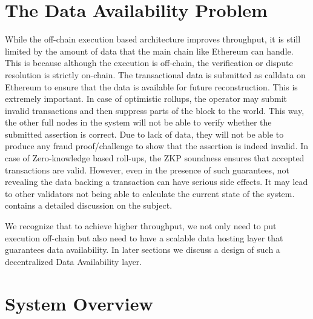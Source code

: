 \documentclass[sigconf, screen=true, nonacm]{acmart}
\begin{document}
\section{The Data Availability Problem} 
    While the off-chain execution based architecture improves throughput, it is still limited by the amount of data that the main chain like Ethereum can handle. This is because although the execution is off-chain, the verification or dispute resolution is strictly on-chain. The transactional data is submitted as calldata on Ethereum to ensure that the data is available for future reconstruction. This is extremely important. In case of optimistic rollups, the operator may submit invalid transactions and then suppress parts of the block to the world. This way, the other full nodes in the system will not be able to verify whether the submitted assertion is correct. Due to lack of data, they will not be able to produce any fraud proof/challenge to show that the assertion is indeed invalid. In case of Zero-knowledge based roll-ups, the ZKP soundness ensures that accepted transactions are valid. However, even in the presence of such guarantees, not revealing the data backing a transaction can have serious side effects. It may lead to other validators not being able to calculate the current state of the system. \cite{EthWiki:2018} contains a detailed discussion on the subject. 

    We recognize that to achieve higher throughput, we not only need to put execution off-chain but also need to have a scalable data hosting layer that guarantees data availability. In later sections we discuss a design of such a decentralized Data Availability layer. 

\section{System Overview}
\end{document}
